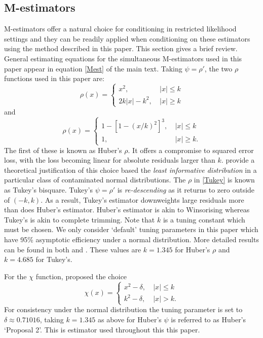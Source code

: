 \documentclass[ba]{imsart}
\begin{document}
\subsection{M-estimators}
\label{sec:Mestimators}
M-estimators offer a natural choice for conditioning in restricted likelihood settings and they can be readily applied when conditioning on these estimators using the method described in this paper. This section gives a brief review. General estimating equations for the simultaneous M-estimators used in this paper appear in equation \ref{Mest} of the main text. Taking $\psi = \rho'$, the two $\rho$ functions used in this paper are: 
\begin{equation}
\label{Huber}
\rho(x)=
\begin{cases}
x^2, & \  |x|\leq k \\
2k|x|-k^2,&\ |x|\geq k 
\end{cases}
\end{equation}
and 
\begin{equation}
\label{Tukey}
\rho(x)=
\begin{cases}
1-[1-(x/k)^2]^3, & \  |x|\leq k \\
1, &\ |x|\geq k .
\end{cases}
\end{equation}
The first of these is known as Huber's $\rho$. It offers a compromise to squared error loss, with the loss becoming linear for absolute residuals larger than $k$. \cite{huber2009} provide a theoretical justification of this choice based the \textit{least informative distribution} in a particular class of contaminated normal distributions. The $\rho$ in \eqref{Tukey} is known as Tukey's bisquare. Tukey's $\psi = \rho'$ is \textit{re-descending} as it returns to zero outside of $(-k,k)$. As a result, Tukey's estimator downweights large residuals more than does Huber's estimator. Huber's estimator is akin to Winsorising whereas Tukey's is akin to complete trimming. Note that $k$ is a tuning constant which must be chosen. We only consider `default' tuning parameters in this paper which have 95\% asymptotic efficiency under a normal distribution. More detailed results can be found in both \cite{huber2009} and \cite{maronna2006}. These values are $k=1.345$ for Huber's $\rho$ and $k=4.685$ for Tukey's. 

For the $\chi$ function, \cite{huber1964} proposed the choice 
\begin{equation}
\label{HuberScale}
\chi(x)=
\begin{cases}
x^2-\delta, &\ |x|\leq k\\
k^2-\delta, &\ |x|> k .
\end{cases}
\end{equation}
For consistency under the normal distribution the tuning parameter is set to $\delta\approx 0.71016$, taking $k = 1.345$ as above for Huber's $\psi$ is
referred to as Huber's `Proposal 2'. This is estimator used throughout this this paper. 







\end{document}
